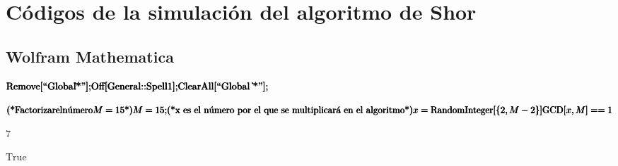 \chapter{Códigos de la simulación del algoritmo de Shor}

\section{Wolfram Mathematica}

\begin{doublespace}
\noindent\(\pmb{\text{Remove}[\text{{``}Global$\grave{ }$*{''}}];}\\
\pmb{\text{Off}[\text{General}\text{::}\text{Spell1}];}\\
\pmb{\text{ClearAll}[\text{{``}Global $\grave{ }$*{''}}];}\)
\end{doublespace}

\begin{doublespace}
\noindent\(\pmb{\text{(*}\text{Factorizar} \text{el} \text{n{\' u}mero} M=15\text{*)}}\\
\pmb{M=15;}\\
\pmb{\text{(*x es el n{\' u}mero por el que se multiplicar{\' a} en el algoritmo*)}}\\
\pmb{x=\text{RandomInteger}[\{2,M-2\}]}\\
\pmb{\text{GCD}[x,M]==1}\)
\end{doublespace}

\begin{doublespace}
\noindent\(7\)
\end{doublespace}

\begin{doublespace}
\noindent\(\text{True}\)
\end{doublespace}

